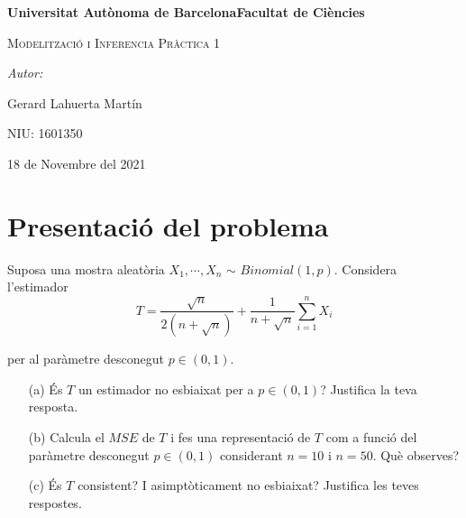 \documentclass[12pt]{article}
\begin{document}
\begin{titlepage}
    \centering
    \vspace{4cm}
    {\bfseries\LARGE Universitat Autònoma de Barcelona\newline Facultat de Ciències\par}
    \vspace{6cm}
    {\scshape\Huge Modelització i Inferencia Pràctica 1 \par} 
    \vspace{2cm}
    {\Large \itshape Autor: \par}
    {\Large Gerard Lahuerta Martín\par}
    {\small NIU: 1601350\par}
    \vspace{3cm}
    {\Large 18 de Novembre del 2021\par}
\end{titlepage}

\justifying


\newpage
\setcounter{page}{2}
\pagestyle{plain}
\tableofcontents
\cleardoublepage
{}
\section{Presentació del problema}
Suposa una mostra aleatòria $X_1, \cdots , X_n$ $\sim$ $Binomial (1, p)$. Considera l'estimador
\begin{equation*}
T = \frac{\sqrt{n}}{2(n+\sqrt{n})}+\frac{1}{n+\sqrt{n}}\sum^{n}_{i=1}{X_i}
\end{equation*}

per al paràmetre desconegut $p \in (0, 1)$.\\
\begin{enumerate}
\item [(a)] És $T$ un estimador no esbiaixat per a $p \in (0, 1)$? Justifica la teva resposta.
\item [(b)] Calcula el $MSE$ de $T$ i fes una representació de $T$ com a funció del paràmetre desconegut
$p \in (0, 1)$ considerant $n = 10$ i $n = 50$. Què observes?
\item [(c)] És $T$ consistent? I asimptòticament no esbiaixat? Justifica les teves respostes.
\end{enumerate}

\newpage
\end{document}
